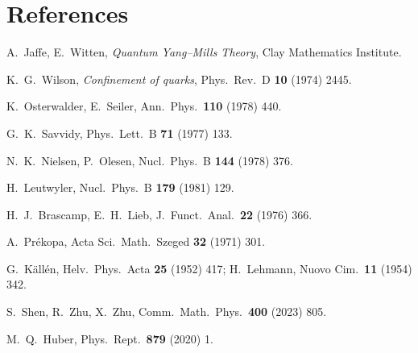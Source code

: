 \documentclass[11pt,a4paper]{article}
\begin{document}
\section*{References}
\small
\begin{enumerate}[label={[\arabic*]},leftmargin=2.2em,itemsep=1pt]
\item A.~Jaffe, E.~Witten, \emph{Quantum Yang--Mills Theory}, Clay Mathematics Institute.
\item K.~G.~Wilson, \emph{Confinement of quarks}, Phys.\ Rev.\ D \textbf{10} (1974) 2445.
\item K.~Osterwalder, E.~Seiler, Ann.\ Phys.\ \textbf{110} (1978) 440.
\item G.~K.~Savvidy, Phys.\ Lett.\ B \textbf{71} (1977) 133.
\item N.~K.~Nielsen, P.~Olesen, Nucl.\ Phys.\ B \textbf{144} (1978) 376.
\item H.~Leutwyler, Nucl.\ Phys.\ B \textbf{179} (1981) 129.
\item H.~J.~Brascamp, E.~H.~Lieb, J.\ Funct.\ Anal.\ \textbf{22} (1976) 366.
\item A.~Pr\'ekopa, Acta Sci.\ Math.\ Szeged \textbf{32} (1971) 301.
\item G.~K\"all\'en, Helv.\ Phys.\ Acta \textbf{25} (1952) 417; H.~Lehmann, Nuovo Cim.\ \textbf{11} (1954) 342.
\item S.~Shen, R.~Zhu, X.~Zhu, Comm.\ Math.\ Phys.\ \textbf{400} (2023) 805.
\item M.~Q.~Huber, Phys.\ Rept.\ \textbf{879} (2020) 1.
\end{enumerate}
\end{document}
